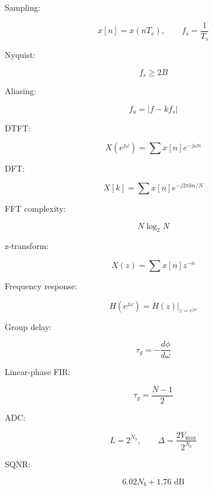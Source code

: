 \begin{tcolorbox}[title=Final One-Minute Revision,colback=blue!5]

Sampling:

\[
x[n]=x(nT_s),
\qquad
f_s=\frac1{T_s}
\]

Nyquist:

\[
f_s\ge2B
\]

Aliasing:

\[
f_a=|f-kf_s|
\]

DTFT:

\[
X(e^{j\omega})=
\sum x[n]e^{-j\omega n}
\]

DFT:

\[
X[k]=
\sum x[n]e^{-j2\pi kn/N}
\]

FFT complexity:

\[
N\log_2N
\]

z-transform:

\[
X(z)=
\sum x[n]z^{-n}
\]

Frequency response:

\[
H(e^{j\omega})=H(z)|_{z=e^{j\omega}}
\]

Group delay:

\[
\tau_g=
-\frac{d\phi}{d\omega}
\]

Linear-phase FIR:

\[
\tau_g=\frac{N-1}{2}
\]

ADC:

\[
L=2^{N_b},
\qquad
\Delta=\frac{2V_{\max}}{2^{N_b}}
\]

SQNR:

\[
6.02N_b+1.76\text{ dB}
\]

\end{tcolorbox}
